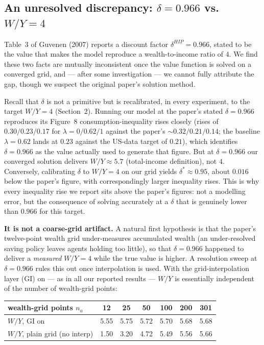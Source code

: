 \documentclass[11pt,fleqn]{article}
\begin{document}
\subsection{An unresolved discrepancy: $\delta=0.966$ vs.\ $W/Y=4$}
\label{app:deltagrid}

Table~3 of Guvenen (2007) reports a discount factor $\delta^{HIP}=0.966$, stated to be
the value that makes the model reproduce a wealth-to-income ratio of $4$. We find these two
facts are mutually inconsistent once the value function is solved on a converged grid, and
--- after some investigation --- we cannot fully attribute the gap, though we suspect the
original paper's solution method.

Recall that $\delta$ is not a primitive but is recalibrated, in every experiment, to the
target $W/Y=4$ (Section~2). Running our model at the paper's stated $\delta=0.966$
reproduces its Figure~8 consumption-inequality rises closely (rises of $0.30/0.23/0.17$
for $\lambda=0/0.62/1$ against the paper's $\sim\!0.32/0.21/0.14$; the baseline
$\lambda=0.62$ lands at $0.23$ against the US-data target of $0.21$), which identifies
$\delta=0.966$ as the value actually used to generate that figure. But at $\delta=0.966$
our converged solution delivers $W/Y\approx5.7$ (total-income definition), not $4$.
Conversely, calibrating $\delta$ to $W/Y=4$ on our grid yields $\delta^*\approx0.95$, about
$0.016$ below the paper's figure, with correspondingly larger inequality rises. This is
why every inequality rise we report sits above the paper's figures: not a modelling error,
but the consequence of solving accurately at a $\delta$ that is genuinely lower than $0.966$
for this target.

\textbf{It is not a coarse-grid artifact.} A natural first hypothesis is that the paper's
twelve-point wealth grid under-measures accumulated wealth (an under-resolved saving policy
leaves agents holding too little), so that $\delta=0.966$ happened to deliver a
\emph{measured} $W/Y=4$ while the true value is higher. A resolution sweep at
$\delta=0.966$ rules this out once interpolation is used. With the grid-interpolation layer
(GI) on --- as in all our reported results --- $W/Y$ is essentially independent of the
number of wealth-grid points:

\begin{center}
\begin{tabular}{lcccccc}
\toprule
wealth-grid points $n_a$ & 12 & 25 & 50 & 100 & 200 & 301 \\
\midrule
$W/Y$, GI on              & 5.55 & 5.75 & 5.72 & 5.70 & 5.68 & 5.68 \\
$W/Y$, plain grid (no interp) & 1.50 & 3.20 & 4.72 & 5.49 & 5.56 & 5.66 \\
\bottomrule
\end{tabular}
\end{center}
\end{document}
